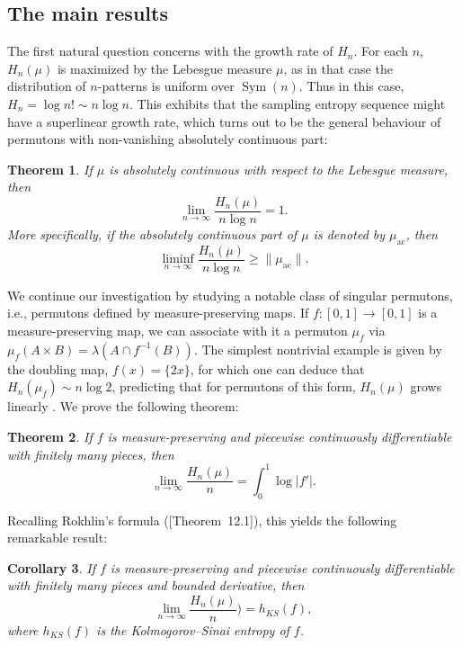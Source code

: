 \documentclass[11pt]{article}
\newcommand{\Sym}{\mathop{\mathrm{Sym}}}
\newtheorem{theorem}{Theorem}[section]
\newtheorem{corollary}[theorem]{Corollary}
\theoremstyle{definition}
\begin{document}
\subsection{The main results}

The first natural question concerns with the growth rate of $H_n$. For each $n$, $H_n(\mu)$ is maximized by the Lebesgue measure $\mu$, as in that case the distribution of $n$-patterns is uniform over $\Sym(n)$. Thus in this case, $H_n=\log {n!}\sim n \log n$. This exhibits that the sampling entropy sequence might have a superlinear growth rate, which turns out to be the general behaviour of permutons with non-vanishing absolutely continuous part:

\begin{theorem} \label{thm:abs_cont}
    If $\mu$ is absolutely continuous with respect to the Lebesgue measure, then
    $$\lim_{n\to\infty} \frac{H_n(\mu)}{n\log n}=1.$$
    More specifically, if the absolutely continuous part of $\mu$ is denoted by $\mu_{\mathrm{ac}}$, then
    $$\liminf_{n\to\infty} \frac{H_n(\mu)}{n\log n}\geq\|\mu_{\mathrm{ac}}\|.$$
\end{theorem}

We continue our investigation by studying a notable class of singular permutons, i.e., permutons defined by measure-preserving maps.
If $f:[0,1]\to[0, 1]$ is a measure-preserving map, we can associate with it a permuton $\mu_f$ via $\mu_f(A\times B) = \lambda(A\cap f^{-1}(B))$. The simplest nontrivial example is given by the doubling map, $f(x)=\{2x\}$, for which one can deduce that $H_n(\mu_f)\sim n\log 2$, predicting that for permutons of this form, $H_n(\mu)$ grows linearly . We prove the following theorem:

\begin{theorem}\label{thm:differentiable_maps}
If $f$ is measure-preserving and piecewise continuously differentiable with finitely many pieces, then
$$\lim_{n\to\infty}\frac{H_n(\mu)}{n}=\int_{0}^{1}\log|f'|.$$
\end{theorem}

Recalling Rokhlin's formula (\cite{Coudene2016}[Theorem~12.1]), this yields the following remarkable result:
\begin{corollary}\label{cor:kolmogorov_sinai_entropy}
    If $f$ is measure-preserving and piecewise continuously differentiable with finitely many pieces and bounded derivative, then
    $$\lim_{n\to\infty}\frac{H_n(\mu)}{n})=h_{KS}(f),$$
    where $h_{KS}(f)$ is the Kolmogorov--Sinai entropy of $f$.
\end{corollary}
\end{document}
